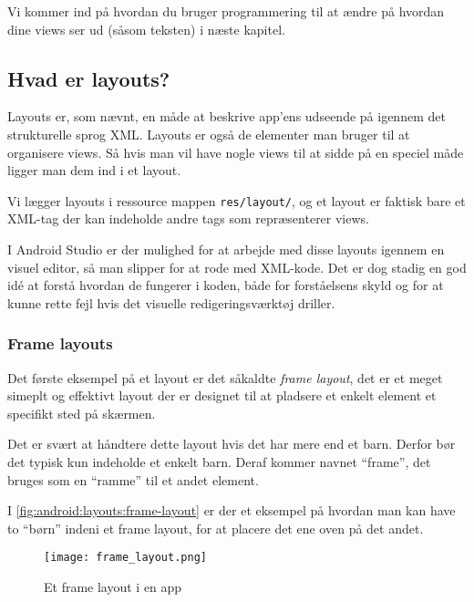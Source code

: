 Vi kommer ind på hvordan du bruger programmering til at ændre på hvordan dine views ser ud (såsom teksten) i næste kapitel.

\subsection{Hvad er layouts?}
Layouts er, som nævnt, en måde at beskrive app'ens udseende på igennem det strukturelle sprog XML. Layouts er også de elementer man bruger til at organisere views. Så hvis man vil have nogle views til at sidde på en speciel måde ligger man dem ind i et layout.

Vi lægger layouts i ressource mappen \texttt{res/layout/}, og et layout er 
faktisk bare et XML-tag der kan indeholde andre tags som repræsenterer views.

I Android Studio er der mulighed for at arbejde med disse layouts igennem en 
visuel editor, så man slipper for at rode med XML-kode. Det er dog stadig en 
god idé at forstå hvordan de fungerer i koden, både for forståelsens skyld og 
for at kunne rette fejl hvis det visuelle redigeringsværktøj driller.

\subsubsection{Frame layouts}

Det første eksempel på et layout er det såkaldte \textit{frame layout}, det er et meget simeplt og effektivt layout der er designet til at pladsere et enkelt element et specifikt sted på skærmen.

Det er svært at håndtere dette layout hvis det har mere end et barn. Derfor bør 
det typisk kun indeholde et enkelt barn. Deraf kommer navnet ``frame'', det 
bruges som en ``ramme'' til et andet element.

I \autoref{fig:android:layouts:frame-layout} er der et eksempel på hvordan man 
kan have to ``børn'' indeni et frame layout, for at placere det ene oven på det 
andet.

\begin{figure}[h]
	\begin{center}
		\texttt{[image: frame\_layout.png]}
		\caption{Et frame layout i en app}
		\label{fig:android:layouts:frame-layout}
	\end{center}
\end{figure}

